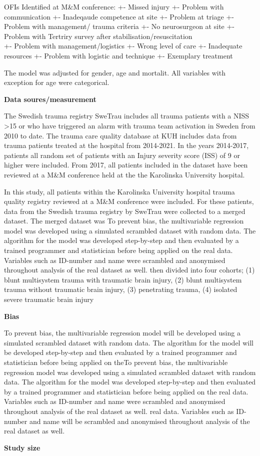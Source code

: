 \documentclass[
]{article}
\begin{document}
OFIs Identified at M\&M conference: +- Missed injury +- Problem with
communication +- Inadeqaude competence at site +- Problem at triage +-
Problem with management/ trauma criteria +- No neurosurgeon at site +-
Problem with Tertriry survey after stabilisation/resuscitation\\
+- Problem with management/logistics +- Wrong level of care +-
Inadequate resources +- Problem with logistic and technique +- Exemplary
treatment

The model was adjusted for gender, age and mortalit. All variables with
exception for age were categorical.

\textbf{Data soures/measurement}

The Swedish trauma registry SweTrau includes all trauma patients with a
NISS \textgreater15 or who have triggered an alarm with trauma team
activation in Sweden from 2010 to date. The trauma care quality database
at KUH includes data from trauma patients treated at the hospital from
2014-2021. In the years 2014-2017, patients all random set of patients
with an Injury severity score (ISS) of 9 or higher were included. From
2017, all patients included in the dataset have been reviewed at a M\&M
conference held at the the Karolinska University hospital.

In this study, all patients within the Karolinska University hospital
trauma quality registry reviewed at a M\&M conference were included. For
these patients, data from the Swedish trauma registry by SweTrau were
collected to a merged dataset. The merged dataset was To prevent bias,
the multivariable regression model was developed using a simulated
scrambled dataset with random data. The algorithm for the model was
developed step-by-step and then evaluated by a trained programmer and
statistician before being applied on the real data. Variables such as
ID-number and name were scrambled and anonymised throughout analysis of
the real dataset as well. then divided into four cohorts; (1) blunt
multisystem trauma with traumatic brain injury, (2) blunt multisystem
trauma without traumatic brain injury, (3) penetrating trauma, (4)
isolated severe traumatic brain injury

\textbf{Bias}

To prevent bias, the multivariable regression model will be developed
using a simulated scrambled dataset with random data. The algorithm for
the model will be developed step-by-step and then evaluated by a trained
programmer and statistician before being applied on theTo prevent bias,
the multivariable regression model was developed using a simulated
scrambled dataset with random data. The algorithm for the model was
developed step-by-step and then evaluated by a trained programmer and
statistician before being applied on the real data. Variables such as
ID-number and name were scrambled and anonymised throughout analysis of
the real dataset as well. real data. Variables such as ID-number and
name will be scrambled and anonymised throughout analysis of the real
dataset as well.

\textbf{Study size}
\end{document}
